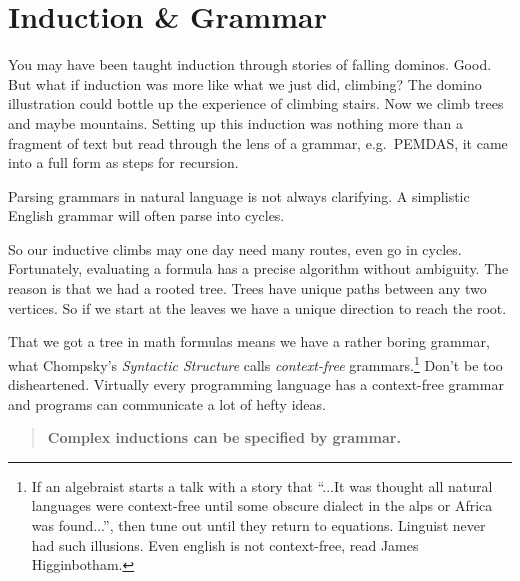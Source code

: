 \section{Induction \& Grammar}
You may have been taught induction through stories of falling 
dominos.  Good.  But what if induction was more like what we just did, climbing?
The domino illustration could bottle up the experience of climbing stairs.  
Now we climb trees and maybe mountains.
Setting up this induction was nothing more than a fragment of text but 
read through the lens of a grammar, e.g.\ PEMDAS, it came into a full form
as steps for recursion.

Parsing grammars in natural language is not always clarifying.  A simplistic
English grammar will often parse into cycles.
\begin{center}
\end{center}
So our inductive climbs may one day need many routes, even go in cycles.
Fortunately, evaluating a formula has a precise algorithm without ambiguity. The
reason is that we had a rooted tree.  Trees have unique paths between any two
vertices. So if we start at the leaves we have a unique direction to reach the
root. 



That we got a tree in math formulas means we have a rather boring grammar, 
what Chompsky's \emph{Syntactic Structure} calls
\emph{context-free} grammars.\footnote{
    If an algebraist starts a talk with a story that ``...It was thought  all natural 
    languages were context-free until some obscure dialect in the alps or Africa was found...'', 
    then tune out until they return to equations.  
    Linguist never had such illusions. Even english is not context-free, read  James Higginbotham.} 
Don't be too disheartened.  Virtually every programming language has a 
context-free grammar and programs can communicate a lot of hefty ideas. 

\begin{quote}
    \textbf{Complex inductions can be specified by grammar.}
\end{quote}
